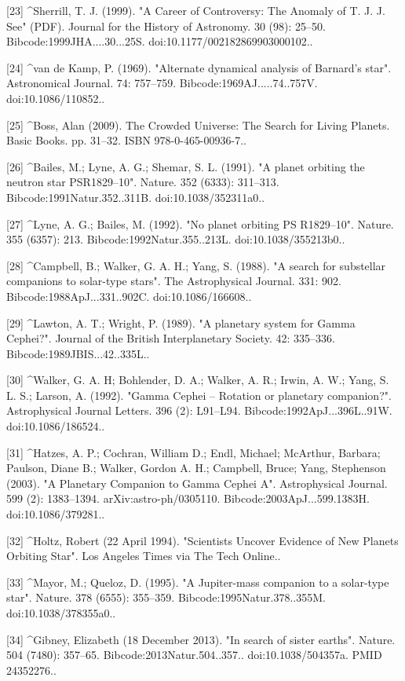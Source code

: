 [23]
^Sherrill, T. J. (1999). "A Career of Controversy: The Anomaly of T. J. J. See" (PDF). Journal for the History of Astronomy. 30 (98): 25–50. Bibcode:1999JHA....30...25S. doi:10.1177/002182869903000102..

[24]
^van de Kamp, P. (1969). "Alternate dynamical analysis of Barnard's star". Astronomical Journal. 74: 757–759. Bibcode:1969AJ.....74..757V. doi:10.1086/110852..

[25]
^Boss, Alan (2009). The Crowded Universe: The Search for Living Planets. Basic Books. pp. 31–32. ISBN 978-0-465-00936-7..

[26]
^Bailes, M.; Lyne, A. G.; Shemar, S. L. (1991). "A planet orbiting the neutron star PSR1829–10". Nature. 352 (6333): 311–313. Bibcode:1991Natur.352..311B. doi:10.1038/352311a0..

[27]
^Lyne, A. G.; Bailes, M. (1992). "No planet orbiting PS R1829–10". Nature. 355 (6357): 213. Bibcode:1992Natur.355..213L. doi:10.1038/355213b0..

[28]
^Campbell, B.; Walker, G. A. H.; Yang, S. (1988). "A search for substellar companions to solar-type stars". The Astrophysical Journal. 331: 902. Bibcode:1988ApJ...331..902C. doi:10.1086/166608..

[29]
^Lawton, A. T.; Wright, P. (1989). "A planetary system for Gamma Cephei?". Journal of the British Interplanetary Society. 42: 335–336. Bibcode:1989JBIS...42..335L..

[30]
^Walker, G. A. H; Bohlender, D. A.; Walker, A. R.; Irwin, A. W.; Yang, S. L. S.; Larson, A. (1992). "Gamma Cephei – Rotation or planetary companion?". Astrophysical Journal Letters. 396 (2): L91–L94. Bibcode:1992ApJ...396L..91W. doi:10.1086/186524..

[31]
^Hatzes, A. P.; Cochran, William D.; Endl, Michael; McArthur, Barbara; Paulson, Diane B.; Walker, Gordon A. H.; Campbell, Bruce; Yang, Stephenson (2003). "A Planetary Companion to Gamma Cephei A". Astrophysical Journal. 599 (2): 1383–1394. arXiv:astro-ph/0305110. Bibcode:2003ApJ...599.1383H. doi:10.1086/379281..

[32]
^Holtz, Robert (22 April 1994). "Scientists Uncover Evidence of New Planets Orbiting Star". Los Angeles Times via The Tech Online..

[33]
^Mayor, M.; Queloz, D. (1995). "A Jupiter-mass companion to a solar-type star". Nature. 378 (6555): 355–359. Bibcode:1995Natur.378..355M. doi:10.1038/378355a0..

[34]
^Gibney, Elizabeth (18 December 2013). "In search of sister earths". Nature. 504 (7480): 357–65. Bibcode:2013Natur.504..357.. doi:10.1038/504357a. PMID 24352276..

